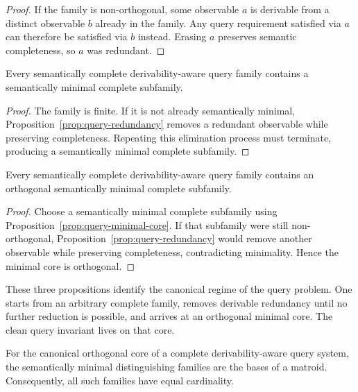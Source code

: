 \begin{proof}
If the family is non-orthogonal, some observable $a$ is derivable from a distinct observable $b$ already in the family. Any query requirement satisfied via $a$ can therefore be satisfied via $b$ instead. Erasing $a$ preserves semantic completeness, so $a$ was redundant.
\end{proof}

\begin{proposition}\label{prop:query-minimal-core}
Every semantically complete derivability-aware query family contains a semantically minimal complete subfamily.
\end{proposition}

\begin{proof}
The family is finite. If it is not already semantically minimal, Proposition~\ref{prop:query-redundancy} removes a redundant observable while preserving completeness. Repeating this elimination process must terminate, producing a semantically minimal complete subfamily.
\end{proof}

\begin{proposition}\label{prop:query-orthogonal-core}
Every semantically complete derivability-aware query family contains an orthogonal semantically minimal complete subfamily.
\end{proposition}

\begin{proof}
Choose a semantically minimal complete subfamily using Proposition~\ref{prop:query-minimal-core}. If that subfamily were still non-orthogonal, Proposition~\ref{prop:query-redundancy} would remove another observable while preserving completeness, contradicting minimality. Hence the minimal core is orthogonal.
\end{proof}

These three propositions identify the canonical regime of the query problem. One starts from an arbitrary complete family, removes derivable redundancy until no further reduction is possible, and arrives at an orthogonal minimal core. The clean query invariant lives on that core.

\begin{theorem}\label{thm:matroid-bases}
For the canonical orthogonal core of a complete derivability-aware query system, the semantically minimal distinguishing families are the bases of a matroid. Consequently, all such families have equal cardinality.
\end{theorem}

